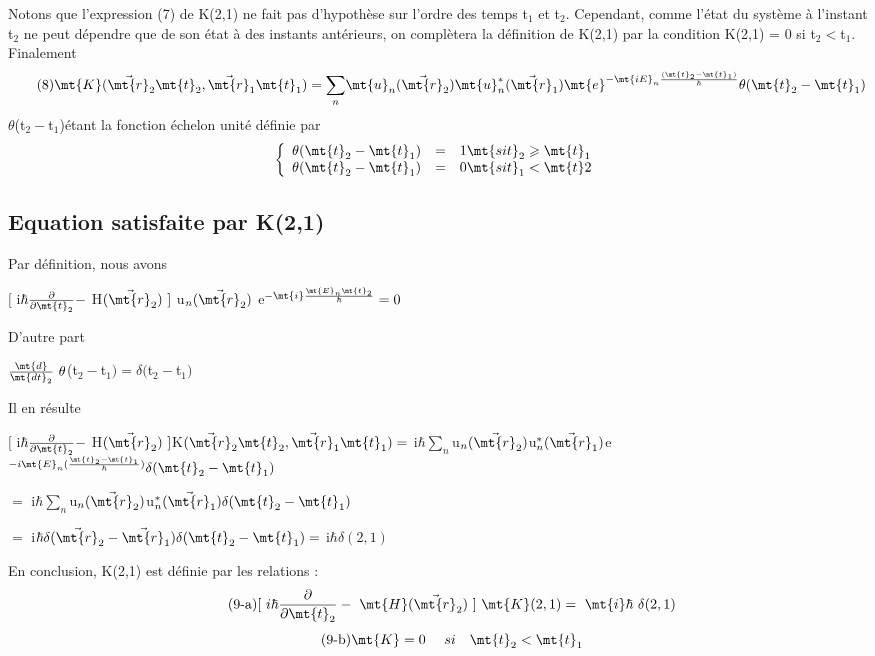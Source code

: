 Notons que l'expression (7) de K(2,1) ne fait pas d'hypothèse
sur l'ordre des temps t$_1$ et t$_2$. Cependant, comme l'état du système à l'instant t$_2$ ne peut dépendre que de son état à des instants antérieurs, on complètera la définition de K(2,1) par la condition K(2,1) = 0 si t$_2<$t$_1$.
Finalement
\[
\tag{8}\mt{K}(\vec{\mt{r}}_2\mt{ t}_2, \vec{\mt{r}}_1\mt{ t}_1)=\underset{n}{\sum} \mt{u}_n(\vec{\mt{r}}_2)\mt{u}_n^*(\vec{\mt{r}}_1)\mt{ e}^{-\mt{iE}_n\frac{(\mt{t}_2-\mt{t}_1)}{\hbar}}\theta(\mt{t}_2-\mt{t}_1)
\]
$\theta$(t$_2-$t$_1$)étant la fonction échelon unité définie par
\[\left \{
 \begin{array}{r c l}
  \theta(\mt{t}_2-\mt{t}_1) & = & 1 \mt{ si t}_2 \geqslant\mt{ t}_1\\
  \theta(\mt{t}_2-\mt{t}_1) & = & 0 \mt{ si t}_1 <\mt{ t}2
 \end{array}
\right . \]
\subsection{Equation satisfaite par K(2,1)}%

Par définition, nous avons
\begin{center}
$[$ i$\hbar\frac{\partial}{\partial\mt{t}_2}-$
H$(\vec{\mt{r}}_2)\ ]$ u$_n(\vec{\mt{r}}_2)$
e$^{-\mt{i}\frac{\mt{E}_n\mt{t}_2}{\hbar}}=0$
\end{center}
D'autre part
\begin{center}
$\frac{\mt{d}}{\mt{dt}_2}\ \theta$(t$_2-$t$_1)=\delta($t$_2-$t$_1)$
\end{center}

Il en résulte
\begin{center}
$[$ i$\hbar\frac{\partial}{\partial\mt{t}_2}-$ H$(\vec{\mt{r}}_2)\ ]$K$(\vec{\mt{r}}_2\mt{t}_2,\vec{\mt{r}}_1\mt{t}_1)=$
i$\hbar\underset{n}{\sum}$u$_n(\vec{\mt{r}}_2)$u$^*_n(\vec{\mt{r}}_1)$e$^{-i\mt{E}_n(\frac{\mt{t}_2-\mt{t}_1}{\hbar})}
\delta(\mt{t}_2-\mt{t}_1)$

$=$ i$\hbar\underset{n}{\sum}$u$_n(\vec{\mt{r}}_2)$u$^*_n(\vec{\mt{r}}_1)\delta(\mt{t}_2-\mt{t}_1)$

$=$ i$\hbar\delta(\vec{\mt{r}}_2-\vec{\mt{r}}_1)\delta(\mt{t}_2-\mt{t}_1)=$ i$\hbar\delta(2,1)$

\end{center}

En conclusion, K(2,1) est définie par les relations :
\[
\tag{9-a}[\ i\hbar\frac{\partial}{\partial\mt{t}_2}-\ \mt{H}(\vec{\mt{r}}_2)\ ]
\ \mt{K}(2,1)=\ \mt{i}\hbar\ \delta(2,1)
\]
\[
\tag{9-b}\mt{K}=0\ \ \ \ si\ \ \ \mt{t}_2<\mt{t}_1
\]

